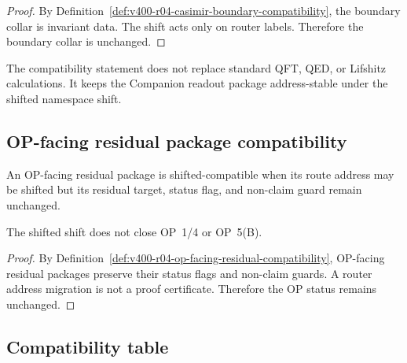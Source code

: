 \begin{proof}
By Definition~\ref{def:v400-r04-casimir-boundary-compatibility}, the boundary
collar is invariant data. The shift acts only on router labels. Therefore the
boundary collar is unchanged.
\end{proof}

\begin{remark}
\label{rem:v400-r04-no-replacement-standard-casimir}
The compatibility statement does not replace standard QFT, QED, or Lifshitz
calculations. It keeps the Companion readout package address-stable under the
shifted namespace shift.
\end{remark}

\subsection{OP-facing residual package compatibility}
\label{subsec:v400-r04-op-facing-residual-package-compatibility}

\begin{definition}
\label{def:v400-r04-op-facing-residual-compatibility}
An OP-facing residual package is shifted-compatible when its route address may be
shifted but its residual target, status flag, and non-claim guard remain
unchanged.
\end{definition}

\begin{lemma}
\label{lem:v400-r04-op-facing-residual-status-preservation}
The shifted shift does not close OP~1/4 or OP~5(B).
\end{lemma}

\begin{proof}
By Definition~\ref{def:v400-r04-op-facing-residual-compatibility}, OP-facing
residual packages preserve their status flags and non-claim guards. A router
address migration is not a proof certificate. Therefore the OP status remains
unchanged.
\end{proof}

\subsection{Compatibility table}
\label{subsec:v400-r04-compatibility-table}

